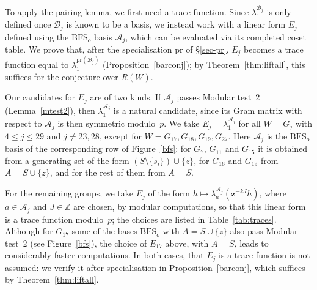 \documentclass[11pt, reqno]{amsart}
\newcommand{\cA}{\mathcal{A}}
\newcommand{\cB}{\mathcal{B}}
\numberwithin{equation}{section}
\theoremstyle{remark}
\begin{document}
To apply the pairing lemma, we first need a trace function. Since $\lambda_1^{\cB_j}$ is only defined once $\cB_j$ is known to be a basis, we instead work with a linear form $E_j$ defined using the $\mathrm{BFS}_o$ basis $\cA_j$, which can be evaluated via its completed coset table.  We prove that, after the specialisation $\mathrm{pr}$ of
\S\ref{sec-pr}, $E_j$ becomes a trace function equal to
$\lambda_1^{\mathrm{pr}(\mathcal B_j)}$ (Proposition~\ref{barconj});
by Theorem~\ref{thm:liftall}, this suffices for the conjecture over
$R(W)$.

Our candidates for $E_j$ are of two kinds. If $\mathcal A_j$ passes
Modular test~2 (Lemma~\ref{mtest2}), then $\lambda_1^{\mathcal A_j}$ is
a natural candidate, since its Gram matrix with respect to
$\mathcal A_j$ is then symmetric modulo~$p$. We take $E_j=\lambda_1^{\mathcal A_j}$ for all $W=G_j$ with $4\le j\le29$ and $j\neq23,28$, except for $W=G_{17},G_{18},G_{19},G_{27}$. Here $\mathcal A_j$ is the $\mathrm{BFS}_o$ basis of the corresponding row of Figure~\ref{bfs}: for $G_7$, $G_{11}$ and $G_{15}$ it is obtained from a generating set of the form $(S\setminus\{s_i\})\cup\{z\}$, for $G_{16}$ and $G_{19}$ from $A=S\cup\{z\}$, and for the rest of them from $A=S$.

For the remaining groups, we take $E_j$ of the form
$h\mapsto\lambda_a^{\mathcal A_j}(\mathbf z^{-kJ}h)$, where $a\in\mathcal A_j$ and
$J\in\mathbb Z$ are chosen, by modular computations, so that this
linear form is a trace function modulo~$p$; the choices are listed in
Table~\ref{tab:traces}. Although for $G_{17}$ some of the bases $\mathrm{BFS}_o$ with $A=S\cup\{z\}$ also pass
Modular test~2 (see Figure~\ref{bfs}), the choice of $E_{17}$ above, with $A=S$, leads to
considerably faster computations.
 In both cases, that $E_j$ is a trace function is not assumed: we verify it after specialisation in Proposition~\ref{barconj}, which suffices by Theorem~\ref{thm:liftall}.
\end{document}
